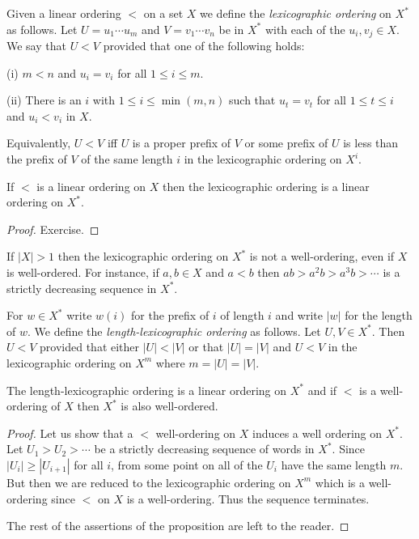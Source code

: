\begin{defn} Given a linear ordering $<$ on a set $X$ we define the
    \emph{lexicographic ordering} on $X^*$ as follows. Let $U = u_1\cdots u_m$
    and $V = v_1 \cdots v_n$ be in $X^*$ with each of the $u_i, v_j \in X$. We
    say that $U< V$ provided that one of the following holds:

    (i) $m < n$ and $u_i = v_i$ for all $1 \le i \le m$.

    (ii) There is an $i$ with $1 \le i \le \min(m,n)$ such that $u_t = v_t$ for all $1 \le t \le i$ and $u_i < v_i$ in $X$.

    Equivalently, $U < V$ iff $U$ is a proper prefix of $V$ or some prefix of
    $U$ is less than the prefix of $V$ of the same length $i$ in the
    lexicographic ordering on $X^i$.
\end{defn}

\begin{prop} If $<$ is a linear ordering on $X$ then the lexicographic ordering
    is a linear ordering on $X^*$.
\end{prop}
\begin{proof} Exercise.
\end{proof}

\begin{ap} If $|X|>1$ then the lexicographic ordering on $X^*$ is not a
    well-ordering, even if $X$ is well-ordered. For instance, if $a,b\in X$ and
    $a<b$ then $ab > a^2b > a^3b > \cdots$ is a strictly decreasing sequence in
    $X^*$.
\end{ap}

\begin{ap} For $w \in X^*$ write $w(i)$ for the prefix of $i$ of length $i$ and
    write $|w|$ for the length of $w$. We define the \emph{length-lexicographic
    ordering} as follows. Let $U,V\in X^*$. Then $U<V$ provided that either
    $|U| < |V|$ or that $|U|=|V|$ and $U < V$ in the lexicographic ordering on
    $X^m$ where $m = |U| = |V|$.
\end{ap}

\begin{prop} The length-lexicographic ordering is a linear ordering on $X^*$
    and if $<$ is a well-ordering of $X$ then $X^*$ is also well-ordered.
\end{prop}
\begin{proof} Let us show that a $<$ well-ordering on $X$ induces a well
    ordering on $X^*$. Let $U_1 > U_2 > \cdots $ be a strictly decreasing
    sequence of words in $X^*$. Since $|U_i| \ge |U_{i+1}|$ for all $i$, from
    some point on all of the $U_i$ have the same length $m$. But then we are
    reduced to the lexicographic ordering on $X^m$ which is a well-ordering
    since $<$ on $X$ is a well-ordering. Thus the sequence terminates.

    The rest of the assertions of the proposition are left to the reader.
\end{proof}

